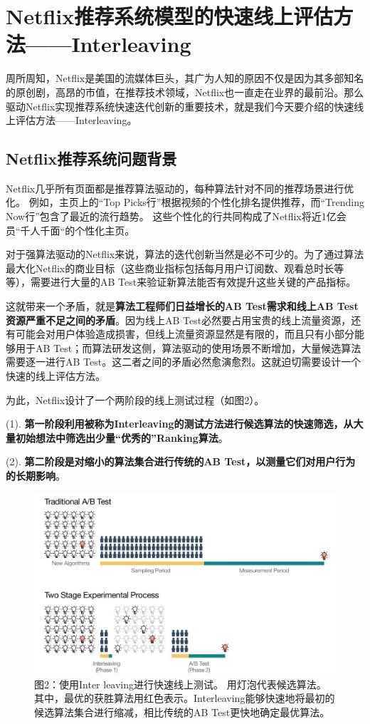 \documentclass[12pt]{article}
\begin{document}
\section{Netflix推荐系统模型的快速线上评估方法——Interleaving\cite{Interleaving_In_Netflix}}
周所周知，Netflix是美国的流媒体巨头，其广为人知的原因不仅是因为其多部知名的原创剧，高昂的市值，在推荐技术领域，Netflix也一直走在业界的最前沿。那么驱动Netflix实现推荐系统快速迭代创新的重要技术，就是我们今天要介绍的快速线上评估方法——Interleaving。

\subsection{Netflix推荐系统问题背景}
Netflix几乎所有页面都是推荐算法驱动的，每种算法针对不同的推荐场景进行优化。 例如，主页上的“Top Picks行”根据视频的个性化排名提供推荐，而“Trending Now行”包含了最近的流行趋势。 这些个性化的行共同构成了Netflix将近1亿会员“千人千面“的个性化主页。

对于强算法驱动的Netflix来说，算法的迭代创新当然是必不可少的。为了通过算法最大化Netflix的商业目标（这些商业指标包括每月用户订阅数、观看总时长等等），需要进行大量的AB Test来验证新算法能否有效提升这些关键的产品指标。

这就带来一个矛盾，就是\textbf{算法工程师们日益增长的AB Test需求和线上AB Test资源严重不足之间的矛盾}。因为线上AB Test必然要占用宝贵的线上流量资源，还有可能会对用户体验造成损害，但线上流量资源显然是有限的，而且只有小部分能够用于AB Test；而算法研发这侧，算法驱动的使用场景不断增加，大量候选算法需要逐一进行AB Test。这二者之间的矛盾必然愈演愈烈。这就迫切需要设计一个快速的线上评估方法。

为此，Netflix设计了一个两阶段的线上测试过程（如图2）。

(1). \textbf{第一阶段利用被称为Interleaving的测试方法进行候选算法的快速筛选，从大量初始想法中筛选出少量“优秀的”Ranking算法}。

(2). \textbf{第二阶段是对缩小的算法集合进行传统的AB Test，以测量它们对用户行为的长期影响}。

\begin{figure}[H]
    \centering
    \includegraphics[width=1\textwidth]{fig/Netflix_Interleaving_Idea.jpg}
    \caption*{图2：使用Inter leaving进行快速线上测试。 用灯泡代表候选算法。 其中，最优的获胜算法用红色表示。Interleaving能够快速地将最初的候选算法集合进行缩减，相比传统的AB Test更快地确定最优算法。}
\end{figure}
\end{document}

